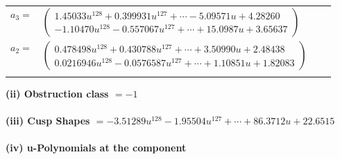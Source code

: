 \documentclass[1p]{elsarticle_modified}
\theoremstyle{definition}
\begin{document}
\begin{tabular}{m{7pt} m{180pt} m{7pt} m{180pt} }
\flushright $a_{3}=$&$\begin{pmatrix}1.45033 u^{128}+0.399931 u^{127}+\cdots-5.09571 u+4.28260\\-1.10470 u^{128}-0.557067 u^{127}+\cdots+15.0987 u+3.65637\end{pmatrix}$ \\
\flushright $a_{2}=$&$\begin{pmatrix}0.478498 u^{128}+0.430788 u^{127}+\cdots+3.50990 u+2.48438\\0.0216946 u^{128}-0.0576587 u^{127}+\cdots+1.10851 u+1.82083\end{pmatrix}$\\&\end{tabular}
\flushleft \textbf{(ii) Obstruction class $= -1$}\\~\\
\flushleft \textbf{(iii) Cusp Shapes $= -3.51289 u^{128}-1.95504 u^{127}+\cdots+86.3712 u+22.6515$}\\~\\
\newpage\renewcommand{\arraystretch}{1}
\flushleft \textbf{(iv) u-Polynomials at the component}\newline \\
\end{document}
